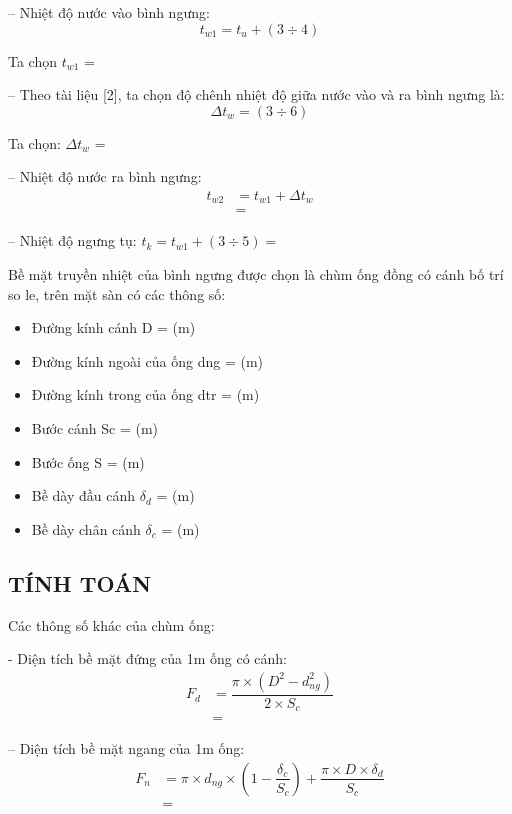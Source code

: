 -- Nhiệt độ nước vào bình ngưng:
\begin{equation*}
	t_{w1} = t_{u} + (3\div 4)
\end{equation*}

Ta chọn $t_{w1}$ = 

-- Theo tài liệu [2], ta chọn độ chênh nhiệt độ giữa nước vào và ra bình ngưng là:
\begin{equation*}
	\Delta t_{w} = (3\div 6)
\end{equation*}

Ta chọn: $\Delta t_{w}$ = 

-- Nhiệt độ nước ra bình ngưng:
\begin{equation*}
	\begin{split}
		 t_{w2} &= t_{w1} + \Delta t_{w} \\
		 &= 
	\end{split}
\end{equation*}

-- Nhiệt độ ngưng tụ: $t_{k} = t_{w1} + (3\div 5) = $

Bề mặt truyền nhiệt của bình ngưng được chọn là chùm ống đồng có cánh bố trí so le, trên mặt sàn có các thông số:
\begin{itemize}
	\item Đường kính cánh D =  (m)
	\item Đường kính ngoài của ống d{\scriptsize ng} =  (m)
	\item Đường kính trong của ống d{\scriptsize tr} =  (m)
	\item Bước cánh S{\scriptsize c} =  (m)
	\item Bước ống S =  (m)
	\item Bề dày đầu cánh $\delta_{d}$ =  (m)
	\item Bề dày chân cánh $\delta_{c}$ =  (m)
\end{itemize}

\subsection{TÍNH TOÁN}
Các thông số khác của chùm ống:

- Diện tích bề mặt đứng của 1m ống có cánh:
\begin{equation*}
	\begin{split}
		F_{d} &= \dfrac{\pi\times (D^2 - d^2_{ng})}{2\times S_{c}}\\
		&=
	\end{split}
\end{equation*}

-- Diện tích bề mặt ngang của 1m ống:
\begin{equation*}
\begin{split}
		F_{n} &= \pi\times d_{ng}\times \left(1-\dfrac{\delta_{c}}{S_{c}}\right) + \dfrac{\pi\times D\times \delta_{d}}{S_{c}}\\
		&= 
\end{split}
\end{equation*}

